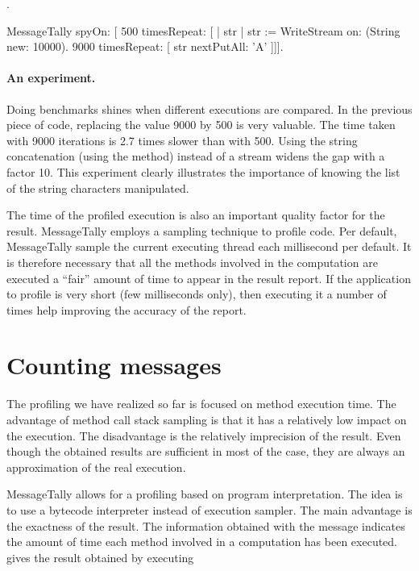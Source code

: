 \documentclass[a4paper,10pt,twoside]{book}
\begin{document}
.
\begin{code}{}
MessageTally spyOn: 
    [ 500 timesRepeat: [
                    | str |  
                    str := WriteStream on: (String new: 10000). 
                    9000 timesRepeat: [ str nextPutAll: 'A' ]]].
\end{code}

\paragraph{An experiment.}
Doing benchmarks shines when different executions are compared. In the previous piece of code, replacing the value 9000 by 500 is very valuable. The time taken with 9000 iterations is 2.7  times slower than with 500. Using the string concatenation (\ie using the \ct{,} method) instead of a stream widens the gap with a factor 10. This experiment clearly illustrates the importance of knowing the list of the string characters manipulated. 

The time of the profiled execution is also an important quality factor for the result. MessageTally employs a sampling technique to profile code. Per default, MessageTally sample the current executing thread each millisecond per default. It is therefore necessary that all the methods involved in the computation are executed a ``fair'' amount of time to appear in the result report. If the application to profile is very short (few milliseconds only), then executing it a  number of times help improving the accuracy of the report. 



\section{Counting messages}
The profiling we have realized so far is focused on method execution time. The advantage of method call stack sampling is that it has a relatively low impact on the execution. The disadvantage is the relatively imprecision of the result. Even though the obtained results are sufficient in most of the case, they are always an approximation of the real execution.

MessageTally allows for a profiling based on program interpretation. The idea is to use a bytecode interpreter instead of execution sampler. The main advantage is the exactness of the result. The information obtained with the message  indicates the amount of time each method involved in a computation has been executed.  gives the result obtained by executing 
\end{document}
